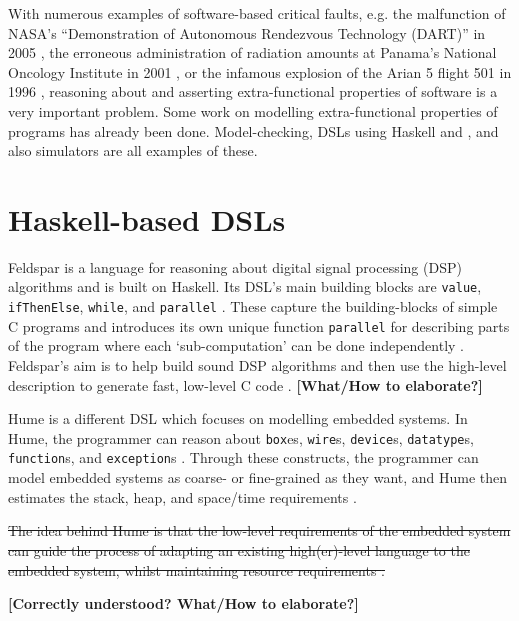 With numerous examples of software-based critical faults, e.g. the malfunction of NASA's ``Demonstration of Autonomous Rendezvous Technology (DART)'' in 2005 \cite{nasa2006dart}, the erroneous administration of radiation amounts at Panama's National Oncology Institute in 2001 \cite{borras2006overexposure}, or the infamous explosion of the Arian 5 flight 501 in 1996 \cite{board1996ariane}, reasoning about and asserting extra-functional properties of software is a very important problem. Some work on modelling extra-functional properties of programs has already been done. Model-checking,  DSLs using Haskell and \Idris, and also simulators are all examples of these.

\section{Haskell-based DSLs}
	Feldspar \cite{5558637} is a language for reasoning about digital signal processing (DSP) algorithms and is built on Haskell. Its DSL's main building blocks are \texttt{value}, \texttt{ifThenElse}, \texttt{while}, and \texttt{parallel} \cite{5558637}. These capture the building-blocks of simple C programs and introduces its own unique function \texttt{parallel} for describing parts of the program where each `sub-computation' can be done independently \cite{5558637}. Feldspar's aim is to help build sound DSP algorithms and then use the high-level description to generate fast, low-level C code \cite{5558637}. \textbf{[What/How to elaborate?]}
    \\\par
	
	Hume \cite{10.1007/978-3-540-39815-8_3} is a different DSL which focuses on modelling embedded systems. In Hume, the programmer can reason about \texttt{box}es, \texttt{wire}s, \texttt{device}s, \texttt{datatype}s, \texttt{function}s, and \texttt{exception}s \cite{10.1007/978-3-540-39815-8_3}. Through these constructs, the programmer can model embedded systems as coarse- or fine-grained as they want, and Hume then estimates the stack, heap, and space/time requirements \cite{10.1007/978-3-540-39815-8_3}.
    
    \sout{The idea behind Hume is that the low-level requirements of the embedded system can guide the process of adapting an existing high(er)-level language to the embedded system, whilst maintaining resource requirements \cite{10.1007/978-3-540-39815-8_3}.}
    
    \textbf{[Correctly understood? What/How to elaborate?]}

